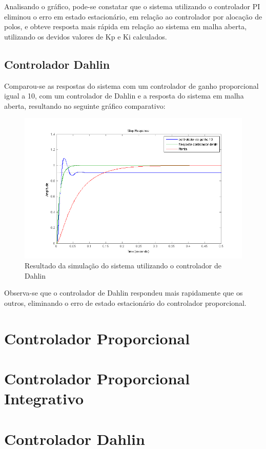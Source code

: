 \documentclass[
oneside,					%
a4paper,					%
english,					%
brazil,					%
]{abntex2}
\begin{document}
Analisando o gráfico, pode-se constatar que o sistema utilizando o controlador PI eliminou o erro em estado estacionário, em relação ao controlador por alocação de polos, e obteve resposta mais rápida em relação ao sistema em malha aberta, utilizando os devidos valores de Kp e Ki calculados.

\section{Controlador Dahlin}

Comparou-se as respostas do sistema com um controlador de ganho proporcional igual a 10, com um controlador de Dahlin e a resposta do sistema em malha aberta, resultando no seguinte gráfico comparativo:

\begin{figure}[H]
	\centering
	\includegraphics[scale = 0.7]{dahlinSimulacao.png}
	\caption{Resultado da simulação do sistema utilizando o controlador de Dahlin}
\end{figure}

Observa-se que o controlador de Dahlin respondeu mais rapidamente que os outros, eliminando o erro de estado estacionário do controlador proporcional.

\postextual
\begin{apendicesenv}
	\chapter{Controlador Proporcional}
	
	\chapter{Controlador Proporcional Integrativo}
	
	\chapter{Controlador Dahlin}
		
\end{apendicesenv}
\end{document}

